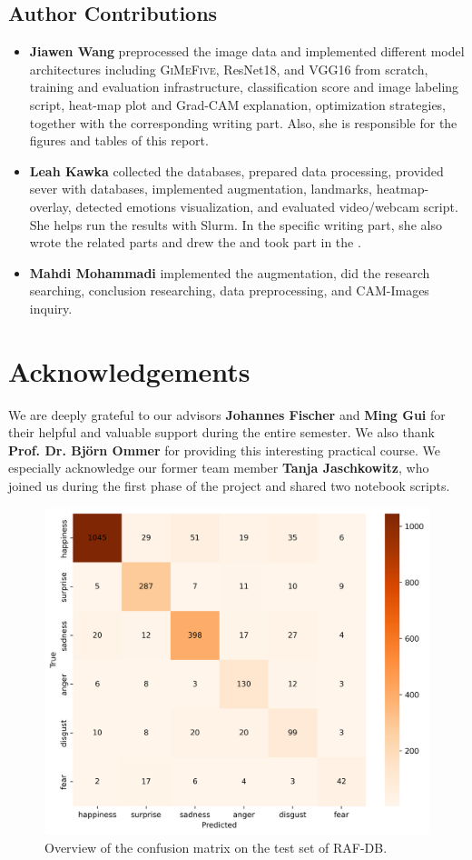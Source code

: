 \subsection*{Author Contributions}
\label{sec:author}

\begin{itemize}
  \item \textbf{Jiawen Wang} preprocessed the image data 
  and implemented different model architectures including \textsc{GiMeFive}, ResNet18, and VGG16 from scratch, 
  training and evaluation infrastructure, classification score and image labeling script, 
  heat-map plot and Grad-CAM explanation, optimization strategies, 
  together with the corresponding writing part. 
  Also, she is responsible for the figures and tables of this report.
  \item \textbf{Leah Kawka} collected the databases, prepared data processing, provided sever with databases, 
  implemented augmentation, landmarks, heatmap-overlay, detected emotions visualization, 
  and evaluated video/webcam script. 
  She helps run the results with Slurm. 
  In the specific writing part, 
  she also wrote the related parts and drew the  and took part in the .
  \item \textbf{Mahdi Mohammadi} implemented the augmentation, did the research searching, conclusion researching, data preprocessing, and CAM-Images inquiry.
\end{itemize}

\section*{Acknowledgements}

We are deeply grateful to our advisors \textbf{Johannes Fischer} and \textbf{Ming Gui} for their helpful and valuable support during the entire semester. 
We also thank \textbf{Prof. Dr. Björn Ommer} for providing this interesting practical course. 
We especially acknowledge our former team member \textbf{Tanja Jaschkowitz}, 
who joined us during the first phase of the project and shared two notebook scripts.

\begin{figure}[ht]
  \centering
   \includegraphics[width=\linewidth]{mattest.png}
   \caption{Overview of the confusion matrix on the test set of RAF-DB.} 
   \label{fig:mattest}
\end{figure}